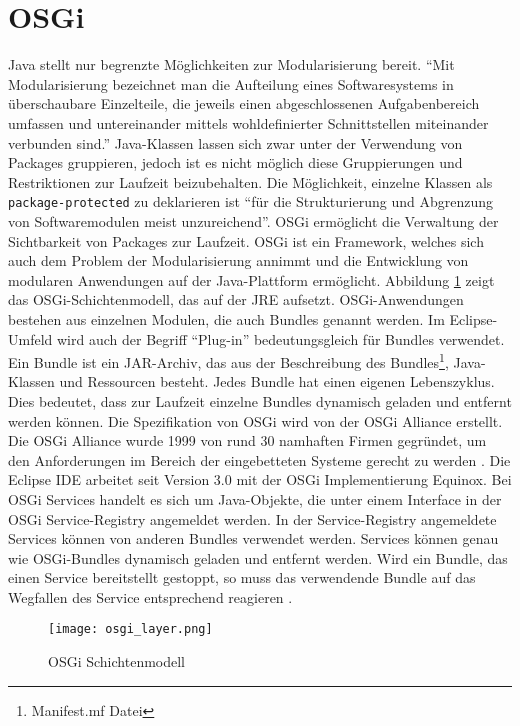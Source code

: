 \section{OSGi}{
\label{sec:OSGi}
Java stellt nur begrenzte Möglichkeiten zur Modularisierung bereit. "`Mit Modularisierung bezeichnet man die Aufteilung eines Softwaresystems in überschaubare Einzelteile, die jeweils einen abgeschlossenen Aufgabenbereich umfassen und untereinander mittels wohldefinierter Schnittstellen miteinander verbunden sind."' \cite[S.11]{rcp_unternehmenseinsatz} Java-Klassen lassen sich zwar unter der Verwendung von Packages gruppieren, jedoch ist es nicht möglich diese Gruppierungen und Restriktionen zur Laufzeit beizubehalten\cite[vgl. S.60]{RalfEbert}. Die Möglichkeit, einzelne Klassen als\\\texttt{package-protected} zu deklarieren ist "`für die
Strukturierung und Abgrenzung von Softwaremodulen meist unzureichend"'\cite[S.60]{RalfEbert}. \ac{OSGi} ermöglicht die Verwaltung der Sichtbarkeit von Packages zur Laufzeit. \ac{OSGi} ist ein Framework, welches sich auch dem Problem der Modularisierung annimmt und die Entwicklung von modularen Anwendungen auf der Java-Plattform ermöglicht. Abbildung \ref{fig:osgi_layer} zeigt das \ac{OSGi}-Schichtenmodell, das auf der \ac{JRE} aufsetzt. \ac{OSGi}-Anwendungen bestehen aus einzelnen Modulen, die auch Bundles genannt werden. Im Eclipse-Umfeld wird auch der Begriff "`Plug-in"' bedeutungsgleich für Bundles verwendet. Ein Bundle ist ein JAR-Archiv, das aus der Beschreibung des Bundles\footnote{Manifest.mf Datei}, Java-Klassen und Ressourcen besteht. Jedes Bundle hat einen eigenen Lebenszyklus. Dies bedeutet, dass zur Laufzeit einzelne Bundles dynamisch geladen und entfernt werden können. Die Spezifikation von \ac{OSGi} wird von der \ac{OSGi} Alliance erstellt. Die \ac{OSGi} Alliance wurde 1999 von rund 30 namhaften Firmen gegründet, um den Anforderungen im Bereich der eingebetteten Systeme gerecht zu werden \cite[vgl. S.3]{Queue}. Die Eclipse \ac{IDE} arbeitet seit Version 3.0 mit der \ac{OSGi} Implementierung Equinox.  Bei \ac{OSGi} Services handelt es sich um Java-Objekte, die unter einem Interface in der \ac{OSGi} Service-Registry angemeldet werden. In der Service-Registry angemeldete Services können von anderen Bundles verwendet werden. Services können genau wie OSGi-Bundles dynamisch geladen und entfernt werden. Wird ein Bundle, das einen Service bereitstellt gestoppt, so muss das verwendende Bundle auf das Wegfallen des Service entsprechend reagieren \cite[vgl. S.114]{OSGi}.
\begin{figure}[htbp] 
\centering
     \texttt{[image: osgi\_layer.png]}
  \caption{OSGi Schichtenmodell \protect  \cite[aus S.2]{OSGi}}
  \label{fig:osgi_layer}
\end{figure}





}

